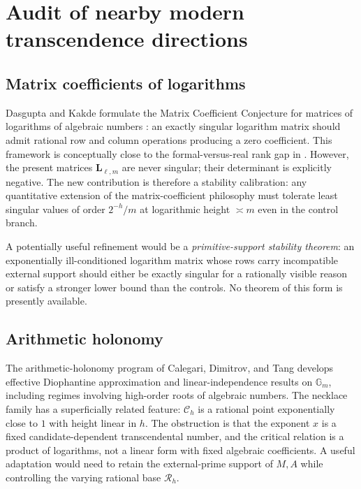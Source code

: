 \documentclass[11pt]{article}
\numberwithin{equation}{section}
\theoremstyle{definition}
\theoremstyle{remark}
\begin{document}
\section{Audit of nearby modern transcendence directions}

\subsection{Matrix coefficients of logarithms}

Dasgupta and Kakde formulate the Matrix Coefficient Conjecture for matrices of logarithms of algebraic numbers \cite{DasguptaKakde}: an exactly singular logarithm matrix should admit rational row and column operations producing a zero coefficient.  This framework is conceptually close to the formal-versus-real rank gap in .  However, the present matrices $\mathbf L_{\ell,m}$ are never singular; their determinant is explicitly negative.  The new contribution is therefore a stability calibration: any quantitative extension of the matrix-coefficient philosophy must tolerate least singular values of order $2^{-h}/m$ at logarithmic height $\asymp m$ even in the control branch.

A potentially useful refinement would be a \emph{primitive-support stability theorem}: an exponentially ill-conditioned logarithm matrix whose rows carry incompatible external support should either be exactly singular for a rationally visible reason or satisfy a stronger lower bound than the controls.  No theorem of this form is presently available.

\subsection{Arithmetic holonomy}

The arithmetic-holonomy program of Calegari, Dimitrov, and Tang \cite{CDTHolonomy} develops effective Diophantine approximation and linear-independence results on $\mathbb G_m$, including regimes involving high-order roots of algebraic numbers.  The necklace family has a superficially related feature: $\mathcal C_h$ is a rational point exponentially close to $1$ with height linear in $h$.  The obstruction is that the exponent $x$ is a fixed candidate-dependent transcendental number, and the critical relation is a product of logarithms, not a linear form with fixed algebraic coefficients.  A useful adaptation would need to retain the external-prime support of $M,A$ while controlling the varying rational base $\mathcal R_h$.
\end{document}
